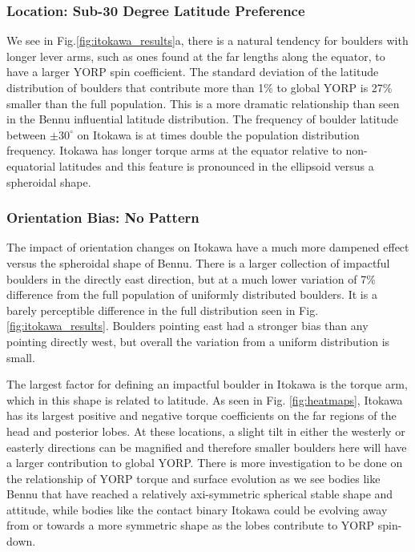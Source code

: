 \subsubsection{Location: Sub-30 Degree Latitude Preference}

We see in Fig.\ref{fig:itokawa_results}a, there is a natural tendency for boulders with longer lever arms, such as ones found at the far lengths along the equator, to have a larger YORP spin coefficient. The standard deviation of the latitude distribution of boulders that contribute more than 1\% to global YORP is 27\% smaller than the full population. This is a more dramatic relationship than seen in the Bennu influential latitude distribution. The frequency of boulder latitude between $\pm30^{\circ}$ on Itokawa is at times double the population distribution frequency. Itokawa has longer torque arms at the equator relative to non-equatorial latitudes and this feature is pronounced in the ellipsoid versus a spheroidal shape.


\subsubsection{Orientation Bias: No Pattern}
The impact of orientation changes on Itokawa have a much more dampened effect versus the spheroidal shape of Bennu. There is a larger collection of impactful boulders in the directly east direction, but at a much lower variation of 7\% difference from the full population of uniformly distributed boulders. It is a barely perceptible difference in the full distribution seen in Fig.\ref{fig:itokawa_results}. Boulders pointing east had a stronger bias than any pointing directly west, but overall the variation from a uniform distribution is small.

The largest factor for defining an impactful boulder in Itokawa is the torque arm, which in this shape is related to latitude. As seen in Fig. \ref{fig:heatmaps}, Itokawa has its largest positive and negative torque coefficients on the far regions of the head and posterior lobes. At these locations, a slight tilt in either the westerly or easterly directions can be magnified and therefore smaller boulders here will have a larger contribution to global YORP. There is more investigation to be done on the relationship of YORP torque and surface evolution as we see bodies like Bennu that have reached a relatively axi-symmetric spherical stable shape and attitude, while bodies like the contact binary Itokawa could be evolving away from or towards a more symmetric shape as the lobes contribute to YORP spin-down. 


